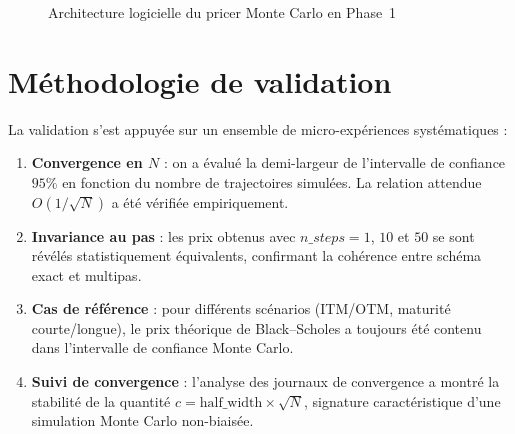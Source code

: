 \documentclass[a4paper,11pt]{article}
\begin{document}
\bigskip
\begin{figure}[H]
\centering
{}
\caption{Architecture logicielle du pricer Monte Carlo en Phase~1}
\label{fig:archi_mc}
\end{figure}


\bigskip

\section{Méthodologie de validation}
La validation s’est appuyée sur un ensemble de micro-expériences systématiques :
\begin{enumerate}
  \item \textbf{Convergence en $N$} : on a évalué la demi-largeur de l’intervalle de confiance $95\%$ en fonction du nombre de trajectoires simulées. La relation attendue $O(1/\sqrt{N})$ a été vérifiée empiriquement.
  \item \textbf{Invariance au pas} : les prix obtenus avec $n\_steps=1$, $10$ et $50$ se sont révélés statistiquement équivalents, confirmant la cohérence entre schéma exact et multipas.
  \item \textbf{Cas de référence} : pour différents scénarios (ITM/OTM, maturité courte/longue), le prix théorique de Black--Scholes a toujours été contenu dans l’intervalle de confiance Monte Carlo.
  \item \textbf{Suivi de convergence} : l’analyse des journaux de convergence a montré la stabilité de la quantité $c = \text{half\_width} \times \sqrt{N}$, signature caractéristique d’une simulation Monte Carlo non-biaisée.
\end{enumerate}
\end{document}
